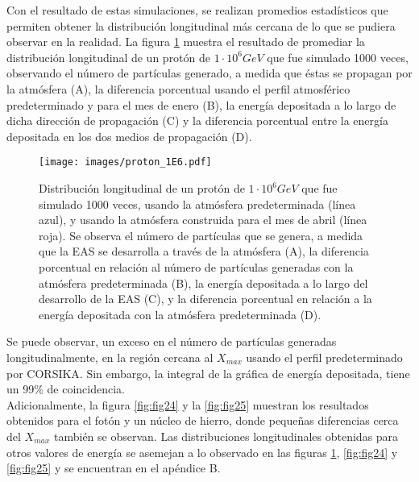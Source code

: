 Con el resultado de estas simulaciones, se realizan promedios estadísticos que permiten obtener la distribución longitudinal más cercana de lo que se pudiera observar en la realidad.  La figura \ref{fig:fig23} muestra el resultado de promediar la distribución longitudinal de un protón de $1\cdot 10^{6} GeV$ que fue simulado 1000 veces, observando el número de partículas  generado, a medida que éstas se propagan por la atmósfera (A),  la diferencia porcentual usando el perfil atmosférico predeterminado y para el mes de enero (B), la energía depositada a lo largo de dicha dirección de propagación (C) y la diferencia porcentual entre la energía depositada en los dos medios de propagación (D).\\

\begin{figure}[htb!]
\centering
\texttt{[image: images/proton\_1E6.pdf]}
\caption[Distribución longitudinal de un protón de $1\cdot 10^{6} GeV$.]{Distribución longitudinal de un protón de $1\cdot 10^{6} GeV$ que fue simulado 1000 veces, usando la atmósfera predeterminada (línea azul), y usando la atmósfera construida para el mes de abril (línea roja). Se observa el número de partículas que se genera, a medida que la EAS se desarrolla a través de la atmósfera (A), la diferencia porcentual en relación al número de partículas generadas con la atmósfera predeterminada (B), la energía depositada a lo largo del desarrollo de la EAS (C), y la diferencia porcentual en relación a la energía depositada con la atmósfera predeterminada (D).}
\label{fig:fig23}
\end{figure}

Se puede observar, un exceso en el número de partículas generadas longitudinalmente, en la región cercana al $X_{max}$ usando el perfil predeterminado por CORSIKA. Sin embargo, la integral de la gráfica de energía depositada, tiene un 99$\%$ de coincidencia.\\

Adicionalmente, la figura \ref{fig:fig24} y la \ref{fig:fig25} muestran los resultados obtenidos para el fotón y un núcleo de hierro, donde pequeñas diferencias cerca del $X_{max}$ también se observan. Las distribuciones longitudinales obtenidas para otros valores de energía se asemejan a lo observado en las figuras \ref{fig:fig23}, \ref{fig:fig24} y \ref{fig:fig25} y se encuentran en el apéndice B.\\

